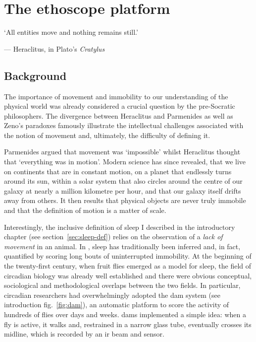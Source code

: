 \edef\figdir{\currfiledir/fig}

\chapter{The ethoscope platform} 

\label{ethoscopes}

\epigraph{
	`All entities move and nothing remains still.'}{--- Heraclitus, in Plato's \emph{Cratylus}\cite[401d]{plato_cratylus_1998}}
	
\section{Background}
The importance of movement and immobility to our understanding of the physical world was already considered
a crucial question by the pre-Socratic philosophers.
The divergence between Heraclitus and Parmenides as well as  Zeno's paradoxes famously illustrate the intellectual challenges associated with the notion of movement and, ultimately, the difficulty of defining it. 

Parmenides argued that movement was `impossible' whilst Heraclitus thought that `everything was in motion'.
Modern science has since revealed, that we live on continents that are in constant motion,
on a planet that endlessly turns around its sun, 
within a solar system that also circles around the centre of our galaxy at nearly a million kilometre per hour,
and that our galaxy itself drifts away from others.
It then results that physical objects are never truly immobile and that the definition of motion is a matter of scale.


Interestingly, the inclusive definition of sleep I described in the introductory chapter (see section~\ref{sec:sleep-def}) relies on the observation of a \emph{lack of movement} in an animal.
In \droso{}, sleep has traditionally been inferred and, in fact, quantified by scoring long bouts of uninterrupted immobility.
At the beginning of the twenty-first century, when fruit flies emerged as a model for sleep, the field of circadian biology was already well established
and there were obvious conceptual, sociological and methodological overlaps between the two fields.
In particular, circadian researchers had overwhelmingly adopted the \gls{dam} system (see introduction fig.~\ref{fig:dam}),
an automatic platform to score the activity of hundreds of flies over
days and weeks.
\glspl{dam} implemented a simple idea: when a fly is active, it walks and, restrained in a narrow glass tube, eventually crosses its midline, which is recorded by an \gls{ir} beam and sensor.

